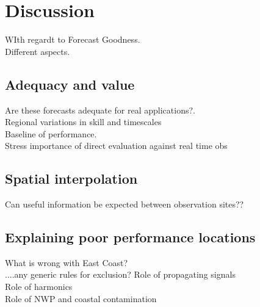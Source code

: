 


\section{Discussion}

WIth regardt to Forecast Goodness.\\
Different aspects.


\subsection{Adequacy and value}
Are these forecasts adequate for real applications?.\\
Regional variations in skill and timescales\\
Baseline of performance.\\
Stress importance of direct evaluation against real time obs\\

\subsection{Spatial interpolation}
Can useful information be expected between observation sites??


\subsection{Explaining poor performance locations}
What is wrong with East Coast?\\
....any generic rules for exclusion?
Role of propagating signals\\
Role of harmonics\\
Role of NWP and coastal contamination\\

